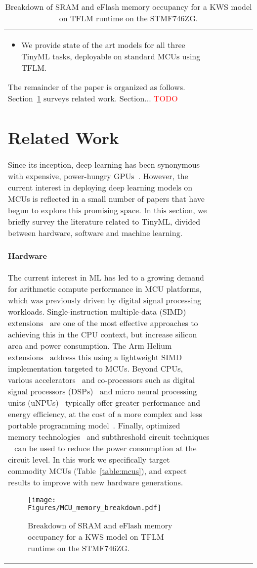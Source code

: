 \documentclass{article}
\newcommand{\RED}[1]{\textcolor{red}{#1}}
\begin{document}
\begin{table}[t]
\begin{tabular}{l| c | c | c | c | c}
\begin{itemize}
    \item We provide state of the art models for all three TinyML tasks, deployable on standard MCUs using TFLM.
\end{itemize}


\if0
The remainder of the paper is organized as follows.
Section~\ref{sec:related} surveys related work.
Section... \RED{TODO}
\fi




\section{Related Work}
\label{sec:related}
Since its inception, deep learning has been synonymous with expensive, power-hungry GPUs~\cite{krizhevsky2012alexnet}.
However, the current interest in deploying deep learning models on MCUs is reflected in a small number of papers that have begun to explore this promising space.
In this section, we briefly survey the literature related to TinyML, divided between hardware, software and machine learning.

\paragraph{Hardware}
The current interest in ML has led to a growing demand for arithmetic compute performance in MCU platforms, which was previously driven by digital signal processing workloads.
Single-instruction multiple-data (SIMD) extensions~\cite{pandh-2011} are one of the most effective approaches to achieving this in the CPU context, but increase silicon area and power consumption.
The Arm Helium extensions~\cite{arm-helium} address this using a lightweight SIMD implementation targeted to MCUs.
Beyond CPUs, various accelerators~\cite{gap8-asap18,kodali-iccd17,whatmough-jssc18,fixy2019sysml} and co-processors such as digital signal processors (DSPs)~\cite{efland2016high} and micro neural processing units (uNPUs)~\cite{arm-u55} typically offer greater performance and energy efficiency, at the cost of a more complex and less portable programming model~\cite{zhu-mlsys19}.
Finally, optimized memory technologies~\cite{mem-li-dac19} and subthreshold circuit techniques 
~\cite{ambiq-spot} can be used to reduce the power consumption at the circuit level.
In this work we specifically target commodity MCUs (Table~\ref{table:mcus}), and expect results to improve with new hardware generations.




\begin{figure}[t]
\centering
\texttt{[image: Figures/MCU\_memory\_breakdown.pdf]}
    \vspace{-8pt}
    \caption{
    Breakdown of SRAM and eFlash memory occupancy for a KWS model on TFLM runtime on the STMF746ZG.}
    \label{fig:mem-map}
\end{figure}





\end{tabular}
\end{table}
\end{document}
